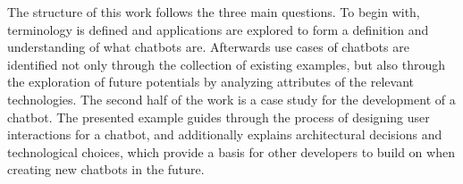 The structure of this work follows the three main questions.
To begin with, terminology is defined and applications are explored to form a definition and understanding of what chatbots are.
Afterwards use cases of chatbots are identified not only through the collection of existing examples, but also through the exploration of future potentials by analyzing attributes of the relevant technologies.
The second half of the work is a case study for the development of a chatbot.
The presented example guides through the process of designing user interactions for a chatbot, and additionally explains architectural decisions and technological choices, which provide a basis for other developers to build on when creating new chatbots in the future.
